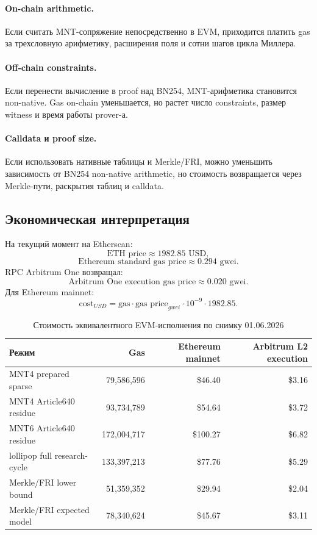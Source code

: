 \documentclass[12pt,a4paper]{article}
\newcommand{\Gas}{\mathrm{gas}}
\begin{document}
\paragraph{On-chain arithmetic.}
Если считать MNT-сопряжение непосредственно в EVM, приходится платить gas за
трехсловную арифметику, расширения поля и сотни шагов цикла Миллера.

\paragraph{Off-chain constraints.}
Если перенести вычисление в proof над BN254, MNT-арифметика становится
non-native. Gas on-chain уменьшается, но растет число constraints, размер
witness и время работы prover-а.

\paragraph{Calldata и proof size.}
Если использовать нативные таблицы и Merkle/FRI, можно уменьшить зависимость от
BN254 non-native arithmetic, но стоимость возвращается через Merkle-пути,
раскрытия таблиц и calldata.

\subsection{Экономическая интерпретация}

На текущий момент на Etherscan:
\[
    \text{ETH price}\approx1982.85\text{ USD},
\]
\[
    \text{Ethereum standard gas price}\approx0.294\text{ gwei}.
\]
RPC Arbitrum One возвращал:
\[
    \text{Arbitrum One execution gas price}\approx0.020\text{ gwei}.
\]
Для Ethereum mainnet:
\[
    \text{cost}_{USD}=
    \Gas\cdot \text{gas price}_{gwei}\cdot10^{-9}\cdot1982.85.
\]

\begin{table}[htbp]
\centering
\caption{Стоимость эквивалентного EVM-исполнения по снимку 01.06.2026}
\small
\begin{tabularx}{\linewidth}{Y r r r}
\toprule
Режим & Gas & Ethereum mainnet & Arbitrum L2 execution \\
\midrule
MNT4 prepared sparse & 79,586,596 & \$46.40 & \$3.16 \\
MNT4 Article640 residue & 93,734,789 & \$54.64 & \$3.72 \\
MNT6 Article640 residue & 172,004,717 & \$100.27 & \$6.82 \\
lollipop full research-cycle & 133,397,213 & \$77.76 & \$5.29 \\
Merkle/FRI lower bound & 51,359,352 & \$29.94 & \$2.04 \\
Merkle/FRI expected model & 78,340,624 & \$45.67 & \$3.11 \\
\bottomrule
\end{tabularx}
\end{table}
\end{document}
